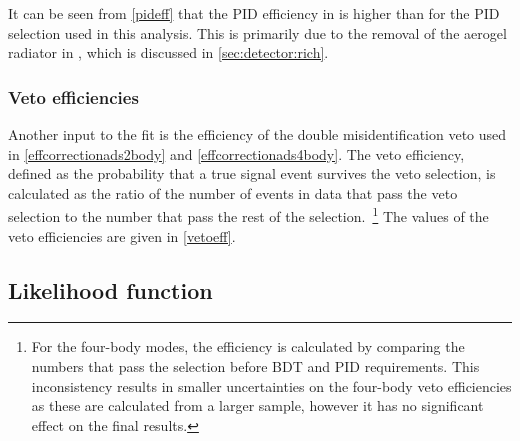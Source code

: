 It can be seen from \tab\ref{pideff} that the PID efficiency in \runtwo is higher than \runone for the PID selection used in this analysis. This is primarily due to the removal of the aerogel radiator in \runtwo, which is discussed in \sect\ref{sec:detector:rich}. 

\subsubsection{Veto efficiencies}
\label{sec:cpfit:efficiencies:veto}

Another input to the fit is the efficiency of the double misidentification veto used in \eqns\ref{effcorrectionads2body} and \ref{effcorrectionads4body}. The veto efficiency, defined as the probability that a true signal event survives the veto selection, is calculated as the ratio of the number of events in data that pass the veto selection to the number that pass the rest of the selection.~\footnote{For the four-body modes, the efficiency is calculated by comparing the numbers that pass the selection before BDT and PID requirements. This inconsistency results in smaller uncertainties on the four-body veto efficiencies as these are calculated from a larger sample, however it has no significant effect on the final results.} The values of the veto efficiencies are given in \tab\ref{vetoeff}.

\begin{table}[h]
\centering
{}
\caption{Summary of the veto efficiencies used in the \CP fit.}
\label{vetoeff}
\end{table}


\subsection{Likelihood function}
\label{sec:cpfit:likelihood}

